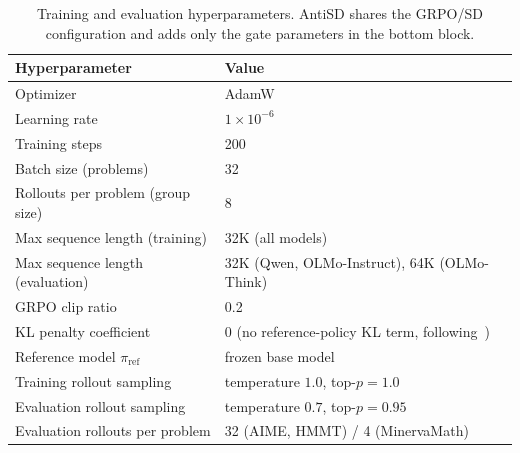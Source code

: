 \documentclass{article}
\begin{document}
\begin{table}[h]
  \centering
  \caption{Training and evaluation hyperparameters. AntiSD shares the GRPO/SD configuration and adds only the gate parameters in the bottom block.}
  \label{tab:hparams}
  \setlength{\tabcolsep}{4pt}
  \small
  \begin{tabular}{ll}
    \toprule
    \textbf{Hyperparameter}                              & \textbf{Value}                                            \\
    \midrule
    Optimizer                                            & AdamW                                                     \\
    Learning rate                                        & $1 \times 10^{-6}$                                        \\
    Training steps                                       & 200                                                       \\
    Batch size (problems)                                & 32                                                        \\
    Rollouts per problem (group size)                    & 8                                                         \\
    Max sequence length (training)                       & 32K (all models)                                          \\
    Max sequence length (evaluation)                     & 32K (Qwen, OLMo-Instruct), 64K (OLMo-Think)               \\
    GRPO clip ratio                                      & 0.2                                                       \\
    KL penalty coefficient                               & $0$ (no reference-policy KL term, following~\citep{dapo}) \\
    Reference model $\pi_{\text{ref}}$                   & frozen base model                                         \\
    Training rollout sampling                            & temperature $1.0$, top-$p\!=\!1.0$                        \\
    Evaluation rollout sampling                          & temperature $0.7$, top-$p\!=\!0.95$                       \\
    Evaluation rollouts per problem                      & 32 (AIME, HMMT) / 4 (MinervaMath)                         \\

\end{tabular}
\end{table}
\end{document}
